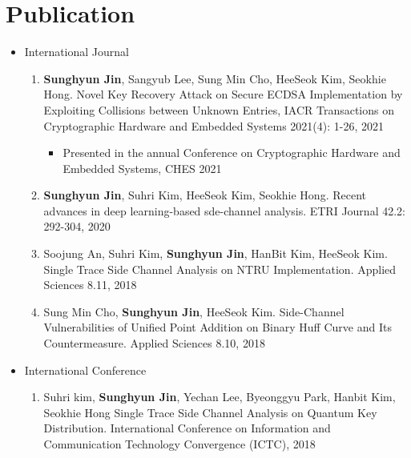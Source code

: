 \documentclass[a4paper,20pt]{article}
\begin{document}
\section{\textbf{Publication}}
\begin{itemize}
    \item {International Journal}
        \vspace{-6pt}
        \begin{enumerate}
            \item {\textbf{Sunghyun Jin}, Sangyub Lee, Sung Min Cho, HeeSeok Kim, Seokhie Hong. Novel Key Recovery Attack on Secure ECDSA Implementation by Exploiting Collisions between Unknown Entries, IACR Transactions on Cryptographic Hardware and Embedded Systems 2021(4): 1-26, 2021}
            \vspace{-2pt}
            \begin{itemize}
                \item {Presented in the annual Conference on Cryptographic Hardware and Embedded Systems, CHES 2021}
            \end{itemize}
            \vspace{-2pt}
            \item {\textbf{Sunghyun Jin}, Suhri Kim, HeeSeok Kim, Seokhie Hong. Recent advances in deep learning-based sde-channel analysis. ETRI Journal 42.2: 292-304, 2020}
            \vspace{-2pt}
            \item {Soojung An, Suhri Kim, \textbf{Sunghyun Jin}, HanBit Kim, HeeSeok Kim. Single Trace Side Channel Analysis on NTRU Implementation. Applied Sciences 8.11, 2018}
            \vspace{-2pt}
            \item {Sung Min Cho, \textbf{Sunghyun Jin}, HeeSeok Kim. Side-Channel Vulnerabilities of Unified Point Addition on Binary Huff Curve and Its Countermeasure. Applied Sciences 8.10, 2018}
            \vspace{-2pt}
        \end{enumerate}
        
    \item {International Conference}
        \vspace{-6pt}
        \begin{enumerate}
            \item {Suhri kim, \textbf{Sunghyun Jin}, Yechan Lee, Byeonggyu Park, Hanbit Kim, Seokhie Hong Single Trace Side Channel Analysis on Quantum Key Distribution. International Conference on Information and Communication Technology Convergence (ICTC), 2018}
            \vspace{-2pt}
        \end{enumerate}
        

\end{itemize}
\end{document}
